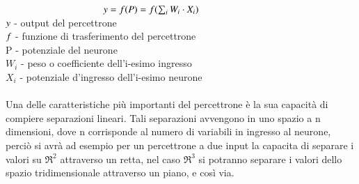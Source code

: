 \documentclass[10pt,a4paper]{article}
\begin{document}
$\hspace*{100pt} y = f(P) = f(\textstyle\sum_i W_i \cdot X_i)$\\
\(\mathnormal{y}\) - output del percettrone\\
\(\mathnormal{f}\) - funzione di trasferimento del percettrone\\
P - potenziale del neurone\\
\(W_i\) - peso o coefficiente dell'i-esimo ingresso\\
\(X_i\) - potenziale d'ingresso dell'i-esimo neurone\\
\\Una delle caratteristiche più importanti del percettrone è la sua capacità di compiere separazioni lineari. Tali separazioni avvengono in uno spazio a n dimensioni, dove n corrisponde al numero di variabili in ingresso al neurone, perciò si avrà ad esempio per un percettrone a due input la capacita di separare i valori su \(\Re^2\) attraverso un retta, nel caso \(\Re^3\) si potranno separare i valori dello spazio tridimensionale attraverso un piano, e così via.\\
\end{document}
